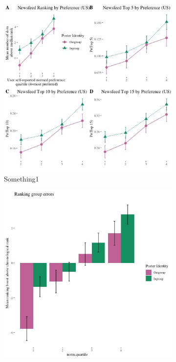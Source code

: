 \documentclass[12pt,letterpaper]{article}
\begin{document}
\begin{figure}[ht]

    \begin{subfigure}{.5\textwidth} 
        \centering
        \includegraphics[width=1\linewidth]{Output/Graphs/Audit/Ranking line graphs/US NF all outcomes panel by norm preference by ingroup.jpg} 
        \caption{Something1}
        \label{fig:sub-first}
        \end{subfigure}
    \begin{subfigure}{.5\textwidth}
        \centering
        \includegraphics[width=1\linewidth]{Output/Graphs/Audit/Misranking relative to expectation/Chronological expectation/US NF by norm preference.jpg}  

\end{subfigure}
\end{figure}
\end{document}
